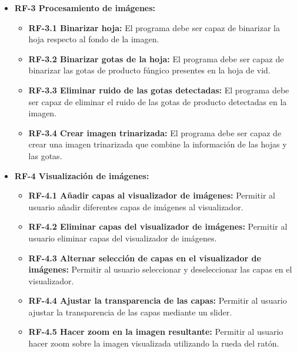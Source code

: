 \begin{itemize}
	\item \textbf{RF-3 Procesamiento de imágenes:}
     	\begin{itemize}
                \item \textbf{RF-3.1 Binarizar hoja:} El programa debe ser capaz de binarizar la hoja respecto al fondo de la imagen.
                \item \textbf{RF-3.2 Binarizar gotas de la hoja:} El programa debe ser capaz de binarizar las gotas de producto fúngico presentes en la hoja de vid.
                \item \textbf{RF-3.3 Eliminar ruido de las gotas detectadas:} El programa debe ser capaz de eliminar el ruido de las gotas de producto detectadas en la imagen.
                \item \textbf{RF-3.4 Crear imagen trinarizada:} El programa debe ser capaz de crear una imagen trinarizada que combine la información de las hojas y las gotas.
    	\end{itemize}    
     
        \item \textbf{RF-4 Visualización de imágenes:}
            \begin{itemize}
                \item \textbf{RF-4.1 Añadir capas al visualizador de imágenes:} Permitir al usuario añadir diferentes capas de imágenes al visualizador.
                \item \textbf{RF-4.2 Eliminar capas del visualizador de imágenes:} Permitir al usuario eliminar capas del visualizador de imágenes.
                \item \textbf{RF-4.3 Alternar selección de capas en el visualizador de imágenes:} Permitir al usuario seleccionar y deseleccionar las capas en el visualizador.
                \item \textbf{RF-4.4 Ajustar la transparencia de las capas:} Permitir al usuario ajustar la transparencia de las capas mediante un slider.
                \item \textbf{RF-4.5 Hacer zoom en la imagen resultante:} Permitir al usuario hacer zoom sobre la imagen visualizada utilizando la rueda del ratón.
            \end{itemize}
     

\end{itemize}
